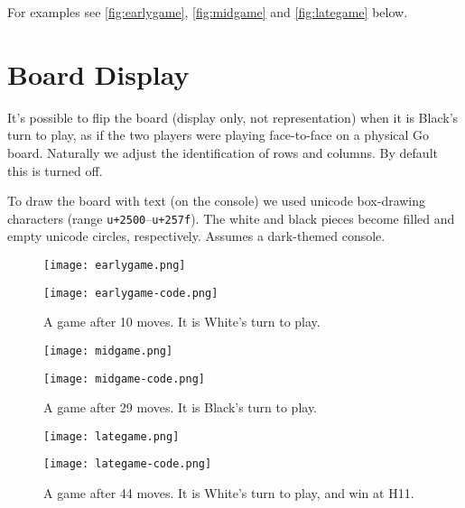 \documentclass[12pt,a4paper,notitlepage]{article}
\begin{document}
For examples see \autoref{fig:earlygame}, \autoref{fig:midgame} and \autoref{fig:lategame} below.

\section{Board Display}
\label{sec:boarddisplay}

It's possible to flip the board (display only, not representation) when it is Black's turn to play, as if the two players were playing face-to-face on a physical Go board. Naturally we adjust the identification of rows and columns. By default this is turned off.

To draw the board with text (on the console) we used unicode box-drawing characters (range \texttt{u+2500}--\texttt{u+257f}). The white and black pieces become filled and empty unicode circles, respectively. Assumes a dark-themed console.

\begin{figure}[bhtp]
	\begin{minipage}{0.45\textwidth}
	\texttt{[image: earlygame.png]}
	\end{minipage}
	\begin{minipage}{0.55\textwidth}
		\texttt{[image: earlygame-code.png]}
	\end{minipage}
	\caption{A game after 10 moves. It is White's turn to play.\label{fig:earlygame}}
\end{figure}

\begin{figure}[bhtp]
	\begin{minipage}{0.45\textwidth}
		\texttt{[image: midgame.png]}
	\end{minipage}
	\begin{minipage}{0.55\textwidth}
		\texttt{[image: midgame-code.png]}
	\end{minipage}
	\caption{A game after 29 moves. It is Black's turn to play.\label{fig:midgame}}
\end{figure}

\begin{figure}[bhtp]
	\begin{minipage}{0.45\textwidth}
		\texttt{[image: lategame.png]}
	\end{minipage}
	\begin{minipage}{0.55\textwidth}
		\texttt{[image: lategame-code.png]}
	\end{minipage}
	\caption{A game after 44 moves. It is White's turn to play, and win at H11.\label{fig:lategame}}
\end{figure}
\end{document}
